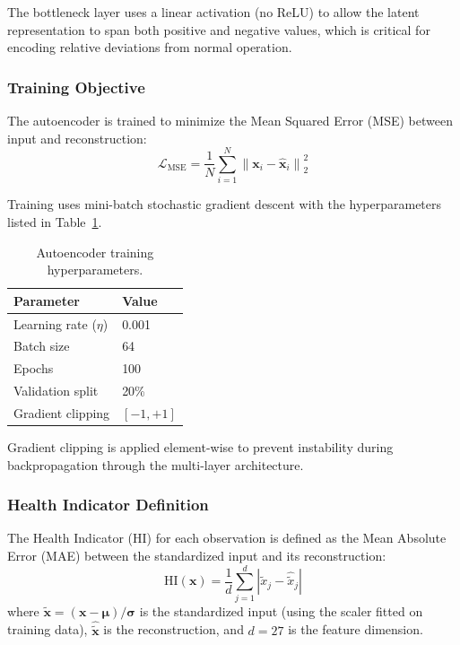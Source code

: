 \documentclass[preprint,12pt]{elsarticle}
\begin{document}
The bottleneck layer uses a linear activation (no ReLU) to allow the latent representation to span both positive and negative values, which is critical for encoding relative deviations from normal operation.

\subsubsection{Training Objective}

The autoencoder is trained to minimize the Mean Squared Error (MSE) between input and reconstruction:
\begin{equation}
    \mathcal{L}_{\mathrm{MSE}} = \frac{1}{N} \sum_{i=1}^{N} \left\| \mathbf{x}_i - \hat{\mathbf{x}}_i \right\|_2^2
\end{equation}

Training uses mini-batch stochastic gradient descent with the hyperparameters listed in Table~\ref{tab:ae_hyperparams}.

\begin{table}[H]
\centering
\caption{Autoencoder training hyperparameters.}
\label{tab:ae_hyperparams}
\begin{tabular}{ll}
\toprule
Parameter & Value \\
\midrule
Learning rate ($\eta$) & 0.001 \\
Batch size & 64 \\
Epochs & 100 \\
Validation split & 20\% \\
Gradient clipping & $[-1, +1]$ \\
\bottomrule
\end{tabular}
\end{table}

Gradient clipping is applied element-wise to prevent instability during backpropagation through the multi-layer architecture.

\subsubsection{Health Indicator Definition}

The Health Indicator (HI) for each observation is defined as the Mean Absolute Error (MAE) between the standardized input and its reconstruction:
\begin{equation}
    \mathrm{HI}(\mathbf{x}) = \frac{1}{d} \sum_{j=1}^{d} \left| \tilde{x}_j - \hat{\tilde{x}}_j \right|
\end{equation}
where $\tilde{\mathbf{x}} = (\mathbf{x} - \boldsymbol{\mu}) / \boldsymbol{\sigma}$ is the standardized input (using the scaler fitted on training data), $\hat{\tilde{\mathbf{x}}}$ is the reconstruction, and $d = 27$ is the feature dimension.
\end{document}
